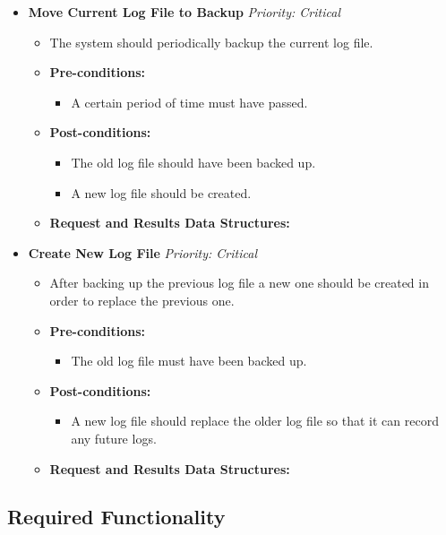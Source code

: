 \documentclass{article}
\begin{document}
				\begin{itemize}
					\item \textbf{Move Current Log File to Backup} \hfill \textit{Priority: Critical}
					\begin{itemize}
						\item The system should periodically backup the current log file.
						\item \textbf{Pre-conditions:}
						\begin{itemize}
							\item A certain period of time must have passed.
						\end{itemize}
						\item \textbf{Post-conditions:}
						\begin{itemize}
							\item The old log file should have been backed up.
							\item A new log file should be created.
						\end{itemize}
						\item \textbf{Request and Results Data Structures:}
					\end{itemize}
					
					\item \textbf{Create New Log File} \hfill \textit{Priority: Critical}
					\begin{itemize}
						\item After backing up the previous log file a new one should be created in order to replace the previous one.
						\item \textbf{Pre-conditions:}
						\begin{itemize}
							\item The old log file must have been backed up.
						\end{itemize}
						\item \textbf{Post-conditions:}
						\begin{itemize}
							\item A new log file should replace the older log file so that it can record any future logs.
						\end{itemize}
						\item \textbf{Request and Results Data Structures:}
					\end{itemize}
				\end{itemize}
			
		\subsection{Required Functionality}\label{subsec:requiredfunctionionality}
	
\end{document}
